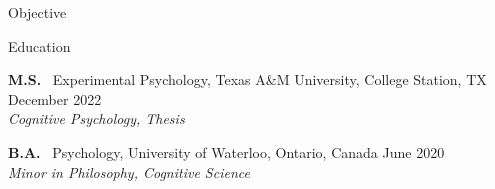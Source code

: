 \documentclass{resume} %
\begin{document}

\begin{rSection}{Objective}

	
	
\end{rSection}

\begin{rSection}{Education}
    
    {\textbf{M.S.} \ Experimental Psychology, Texas A\&M University, College 
    Station, 
    TX \hfill {December 2022}
    \\ \textit {Cognitive Psychology, Thesis}}
    
    {\textbf{B.A.} \ Psychology, University of Waterloo, Ontario, Canada \hfill 
    { 
    June 2020}
    \\ \textit {Minor in Philosophy, Cognitive Science}}

\end{rSection}
\end{document}
